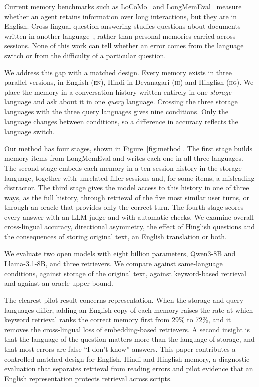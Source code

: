 \documentclass[11pt]{article}
\newcommand{\EN}{\textsc{en}}
\newcommand{\HI}{\textsc{hi}}
\newcommand{\HG}{\textsc{hg}}
\begin{document}
Current memory benchmarks such as LoCoMo~\citep{maharana2024locomo} and LongMemEval~\citep{wu2025longmemeval} measure whether an agent retains information over long interactions, but they are in English.
Cross-lingual question answering studies questions about documents written in another language~\citep{lewis2020mlqa}, rather than personal memories carried across sessions.
None of this work can tell whether an error comes from the language switch or from the difficulty of a particular question.

We address this gap with a matched design.
Every memory exists in three parallel versions, in English (\EN), Hindi in Devanagari (\HI) and Hinglish (\HG).
We place the memory in a conversation history written entirely in one \emph{storage} language and ask about it in one \emph{query} language.
Crossing the three storage languages with the three query languages gives nine conditions.
Only the language changes between conditions, so a difference in accuracy reflects the language switch.

Our method has four stages, shown in Figure~\ref{fig:method}.
The first stage builds memory items from LongMemEval and writes each one in all three languages.
The second stage embeds each memory in a ten-session history in the storage language, together with unrelated filler sessions and, for some items, a misleading distractor.
The third stage gives the model access to this history in one of three ways, as the full history, through retrieval of the five most similar user turns, or through an oracle that provides only the correct turn.
The fourth stage scores every answer with an LLM judge and with automatic checks. We examine overall cross-lingual accuracy, directional asymmetry, the effect of Hinglish questions and the consequences of storing original text, an English translation or both.

We evaluate two open models with eight billion parameters, Qwen3-8B and Llama-3.1-8B, and three retrievers.
We compare against same-language conditions, against storage of the original text, against keyword-based retrieval and against an oracle upper bound.

The clearest pilot result concerns representation.
When the storage and query languages differ, adding an English copy of each memory raises the rate at which keyword retrieval ranks the correct memory first from 29\% to 72\%, and it removes the cross-lingual loss of embedding-based retrievers.
A second insight is that the language of the question matters more than the language of storage, and that most errors are false ``I don't know'' answers. This paper contributes a controlled matched design for English, Hindi and Hinglish memory, a diagnostic evaluation that separates retrieval from reading errors and pilot evidence that an English representation protects retrieval across scripts.
\end{document}
